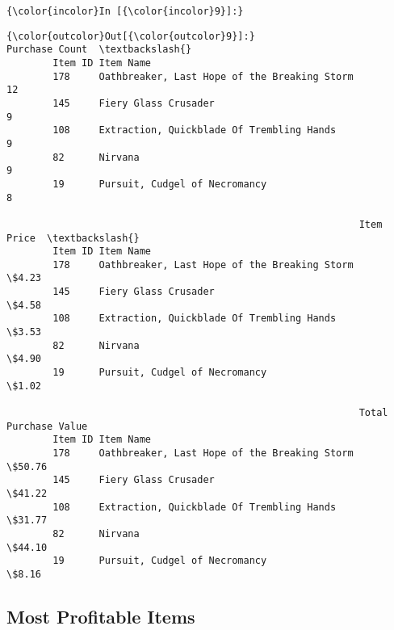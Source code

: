 \documentclass[11pt]{article}
\begin{document}
    \begin{Verbatim}[commandchars=\\\{\}]
{\color{incolor}In [{\color{incolor}9}]:} 
\end{Verbatim}


\begin{Verbatim}[commandchars=\\\{\}]
{\color{outcolor}Out[{\color{outcolor}9}]:}                                                      Purchase Count  \textbackslash{}
        Item ID Item Name                                                     
        178     Oathbreaker, Last Hope of the Breaking Storm             12   
        145     Fiery Glass Crusader                                      9   
        108     Extraction, Quickblade Of Trembling Hands                 9   
        82      Nirvana                                                   9   
        19      Pursuit, Cudgel of Necromancy                             8   
        
                                                             Item Price  \textbackslash{}
        Item ID Item Name                                                 
        178     Oathbreaker, Last Hope of the Breaking Storm      \$4.23   
        145     Fiery Glass Crusader                              \$4.58   
        108     Extraction, Quickblade Of Trembling Hands         \$3.53   
        82      Nirvana                                           \$4.90   
        19      Pursuit, Cudgel of Necromancy                     \$1.02   
        
                                                             Total Purchase Value  
        Item ID Item Name                                                          
        178     Oathbreaker, Last Hope of the Breaking Storm               \$50.76  
        145     Fiery Glass Crusader                                       \$41.22  
        108     Extraction, Quickblade Of Trembling Hands                  \$31.77  
        82      Nirvana                                                    \$44.10  
        19      Pursuit, Cudgel of Necromancy                               \$8.16  
\end{Verbatim}
            
    \hypertarget{most-profitable-items}{%
\subsection{Most Profitable Items}\label{most-profitable-items}}
\end{document}
